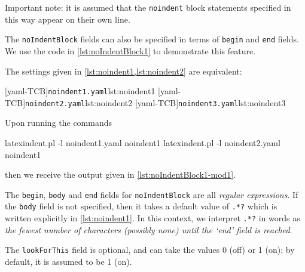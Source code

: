 
	Important note: it is assumed that the \texttt{noindent} block statements specified in
	this way appear on their own line.

	The%
	 \texttt{noIndentBlock} fields can also be specified in terms of \texttt{begin} and
	\texttt{end} fields. We use the code in \cref{lst:noIndentBlock1} to demonstrate this
	feature.


	The settings given in \cref{lst:noindent1,lst:noindent2} are equivalent:

	\begin{cmhtcbraster}[raster columns=3,
			raster left skip=-3.5cm,
			raster right skip=-2cm,
			raster column skip=.03\linewidth]
		[yaml-TCB]{\texttt{noindent1.yaml}}{lst:noindent1}
		[yaml-TCB]{\texttt{noindent2.yaml}}{lst:noindent2}
		[yaml-TCB]{\texttt{noindent3.yaml}}{lst:noindent3}
	\end{cmhtcbraster}

	Upon running the commands
	\begin{commandshell}
latexindent.pl -l noindent1.yaml noindent1
latexindent.pl -l noindent2.yaml noindent1
\end{commandshell}
	then we receive the output given in \cref{lst:noIndentBlock1-mod1}.


	The \texttt{begin}, \texttt{body} and \texttt{end} fields for \texttt{noIndentBlock} are
	all \emph{regular expressions}. If the \texttt{body} field is not specified, then it
	takes a default value of
	\lstinline!.*?! which is written explicitly in \cref{lst:noindent1}. In this
	context, we interpret \lstinline!.*?! in words as \emph{the fewest number of characters
		(possibly none) until the `end' field is reached}.

	The \texttt{lookForThis} field is optional, and can take the values 0 (off) or 1 (on); by
	default, it is assumed to be 1 (on).

